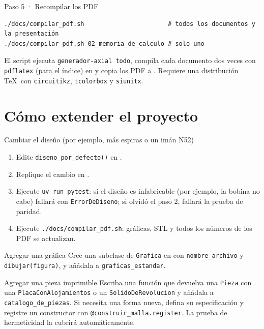 \documentclass[11pt]{article}
\begin{document}
\begin{paso}{Paso 5 · Recompilar los PDF}
\begin{lstlisting}[style=consola]
./docs/compilar_pdf.sh                       # todos los documentos y la presentación
./docs/compilar_pdf.sh 02_memoria_de_calculo # solo uno
\end{lstlisting}
El script ejecuta \texttt{generador-axial todo}, compila cada documento dos veces con \texttt{pdflatex} (para el
índice) en  y copia los PDF a . Requiere una distribución \TeX\ con
\texttt{circuitikz}, \texttt{tcolorbox} y \texttt{siunitx}.
\end{paso}

\section{Cómo extender el proyecto}
\begin{paso}{Cambiar el diseño (por ejemplo, más espiras o un imán N52)}
\begin{enumerate}
  \item Edite \texttt{diseno\_por\_defecto()} en .
  \item Replique el cambio en .
  \item Ejecute \texttt{uv run pytest}: si el diseño es infabricable (por ejemplo, la bobina no cabe) fallará con
        \texttt{ErrorDeDiseno}; si olvidó el paso 2, fallará la prueba de paridad.
  \item Ejecute \texttt{./docs/compilar\_pdf.sh}: gráficas, STL y todos los números de los PDF se actualizan.
\end{enumerate}
\end{paso}

\begin{paso}{Agregar una gráfica}
Cree una subclase de \texttt{Grafica} en  con \texttt{nombre\_archivo} y
\texttt{dibujar(figura)}, y añádala a \texttt{graficas\_estandar}.
\end{paso}

\begin{paso}{Agregar una pieza imprimible}
Escriba una función que devuelva una \texttt{Pieza} con una \texttt{PlacaConAlojamientos} o un
\texttt{SolidoDeRevolucion} y añádala a \texttt{catalogo\_de\_piezas}. Si necesita una forma nueva, defina su
especificación y registre un constructor con \texttt{@construir\_malla.register}. La prueba de hermeticidad la
cubrirá automáticamente.
\end{paso}
\end{document}
